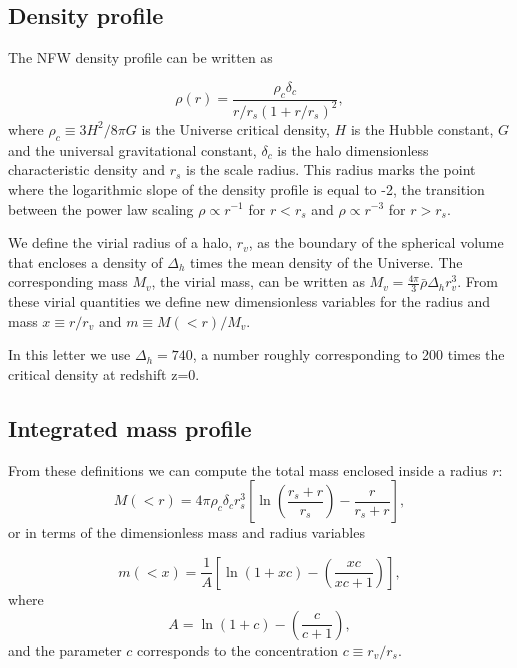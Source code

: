 \documentclass[a4,useAMS,usenatbib,usegraphicx]{mn2e}
\begin{document}
\subsection{Density profile}

The NFW density profile can be written as

\begin{equation}
\rho(r) = \frac{\rho_c\delta_c}{r/r_s(1+r/r_s)^2},
\label{eq:definition}
\end{equation}
%
where $\rho_c\equiv 3H^2/8\pi G$ is the Universe critical density, $H$
is the Hubble constant, $G$ and the universal gravitational constant,
$\delta_c$ is the halo dimensionless characteristic density and $r_s$
is the scale radius. 
This radius marks the point where the logarithmic slope of the density
profile is equal to -2, the transition between the power law
scaling $\rho\propto r^{-1}$ for $r<r_s$ and $\rho\propto r^{-3}$ for
$r>r_s$. 

We define the virial radius of a halo, $r_v$, as the boundary of the
spherical volume that encloses a density of $\Delta_h$ times the mean
density of the Universe.  
The corresponding mass $M_{v}$, the virial mass, can be written as
$M_{v} = \frac{4\pi}{3}\bar{\rho}\Delta_h r_v^3$.  
From these virial quantities we define new dimensionless variables for
the radius and mass $x\equiv r/r_v$ and $m\equiv M(<r)/M_v$. 

In this letter we use $\Delta_h=740$, a number roughly corresponding to
200 times the critical density at redshift z=0.


\subsection{Integrated mass profile}

From these definitions we can compute the total mass enclosed inside a
radius $r$:
\begin{equation}
M(<r) = 4\pi\rho_c\delta_c  r_s^3\left[\ln \left
  (\frac{r_s+r}{r_s}\right) - \frac{r}{r_s+r}\right],
\end{equation}
%
or in terms of the dimensionless mass and radius variables

\begin{equation}
m(<x) =
\frac{1}{A}\left[\ln\left(1+xc\right)-\left(\frac{xc}{xc+1}\right)\right],
\label{eq:profile}
\end{equation}
%
where
%
\begin{equation}
A=\ln\left(1+c\right)-\left(\frac{c}{c+1}\right),
\end{equation}
%
and the parameter $c$ corresponds to the concentration $c\equiv r_v/r_s$.
\end{document}
